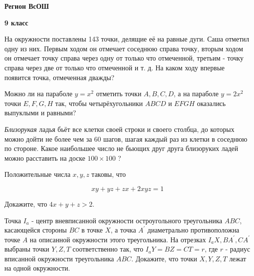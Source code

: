 \centerline{\bf \Huge Регион ВсОШ}
\centerline{\bf \Huge 9 класс}

\begin{flushright}
        \scriptsize{}
\end{flushright}

На окружности поставлены 143 точки, делящие её на равные дуги. Саша отметил одну из них. Первым ходом он отмечает соседнюю справа точку, вторым ходом он отмечает точку справа через одну от только что отмеченной, третьим - точку справа через две от только что отмеченной и т. д. На каком ходу впервые появится точка, отмеченная дважды?

Можно ли на параболе $y=x^2$ отметить точки $A, B, C, D$, а на параболе $y=2 x^2$ точки $E, F, G, H$ так, чтобы четырёхугольники $A B C D$ и $E F G H$ оказались выпуклыми и равными?

\textit{Близорукая} ладья бьёт все клетки своей строки и своего столбца, до которых можно дойти не более чем за 60 шагов, шагая каждый раз из клетки в соседнюю по стороне. Какое наибольшее число не бьющих друг друга близоруких ладей можно расставить на доске $100 \times 100$ ?

Положительные числа $x, y, z$ таковы, что

$$
x y+y z+z x+2 x y z=1
$$


Докажите, что $4 x+y+z>2$.


Точка $I_a$ - центр вневписанной окружности остроугольного треугольника $A B C$, касающейся стороны $B C$ в точке $X$, а точка $A^{\prime}$ диаметрально противоположна точке $A$ на описанной окружности этого треугольника. На отрезках $I_a X, B A^{\prime}, C A^{\prime}$ выбраны точки $Y, Z, T$ соответственно так, что $I_a Y=B Z=C T=r$, где $r$ - радиус вписанной окружности треугольника $A B C$. Докажите, что точки $X, Y, Z, T$ лежат на одной окружности.

